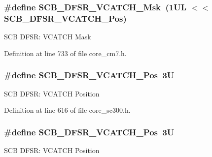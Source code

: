 \subsubsection[{\texorpdfstring{S\+C\+B\+\_\+\+D\+F\+S\+R\+\_\+\+V\+C\+A\+T\+C\+H\+\_\+\+Msk}{SCB_DFSR_VCATCH_Msk}}]{\setlength{\rightskip}{0pt plus 5cm}\#define S\+C\+B\+\_\+\+D\+F\+S\+R\+\_\+\+V\+C\+A\+T\+C\+H\+\_\+\+Msk~(1\+U\+L $<$$<$ S\+C\+B\+\_\+\+D\+F\+S\+R\+\_\+\+V\+C\+A\+T\+C\+H\+\_\+\+Pos)}\hypertarget{group___c_m_s_i_s___s_c_b_gacbb931575c07b324ec793775b7c44d05}{}\label{group___c_m_s_i_s___s_c_b_gacbb931575c07b324ec793775b7c44d05}
S\+CB D\+F\+SR\+: V\+C\+A\+T\+CH Mask 

Definition at line 733 of file core\+\_\+cm7.\+h.

\subsubsection[{\texorpdfstring{S\+C\+B\+\_\+\+D\+F\+S\+R\+\_\+\+V\+C\+A\+T\+C\+H\+\_\+\+Pos}{SCB_DFSR_VCATCH_Pos}}]{\setlength{\rightskip}{0pt plus 5cm}\#define S\+C\+B\+\_\+\+D\+F\+S\+R\+\_\+\+V\+C\+A\+T\+C\+H\+\_\+\+Pos~3U}\hypertarget{group___c_m_s_i_s___s_c_b_gad02d3eaf062ac184c18a7889c9b6de57}{}\label{group___c_m_s_i_s___s_c_b_gad02d3eaf062ac184c18a7889c9b6de57}
S\+CB D\+F\+SR\+: V\+C\+A\+T\+CH Position 

Definition at line 616 of file core\+\_\+sc300.\+h.

\subsubsection[{\texorpdfstring{S\+C\+B\+\_\+\+D\+F\+S\+R\+\_\+\+V\+C\+A\+T\+C\+H\+\_\+\+Pos}{SCB_DFSR_VCATCH_Pos}}]{\setlength{\rightskip}{0pt plus 5cm}\#define S\+C\+B\+\_\+\+D\+F\+S\+R\+\_\+\+V\+C\+A\+T\+C\+H\+\_\+\+Pos~3U}\hypertarget{group___c_m_s_i_s___s_c_b_gad02d3eaf062ac184c18a7889c9b6de57}{}\label{group___c_m_s_i_s___s_c_b_gad02d3eaf062ac184c18a7889c9b6de57}
S\+CB D\+F\+SR\+: V\+C\+A\+T\+CH Position 

